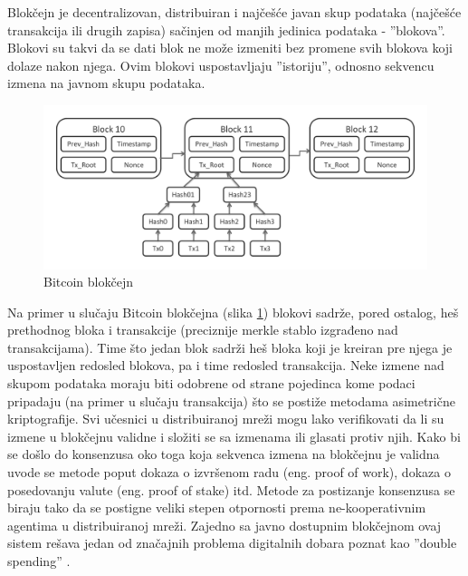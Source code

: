 \documentclass[a4paper]{article}
\begin{document}
Blokčejn je decentralizovan, distribuiran i najčešće javan skup podataka (najčešće transakcija ili drugih zapisa) \cite{wood2014ethereum} sačinjen od manjih jedinica podataka - ''blokova''.
Blokovi su takvi da se dati blok ne može izmeniti bez promene svih blokova koji dolaze nakon njega. Ovim blokovi uspostavljaju ''istoriju'', odnosno sekvencu izmena na javnom skupu podataka.
\begin{figure}[H]
    \centering
        \includegraphics[scale=0.3]{bitcoin_blockchain_diagram.pdf}
    \caption{Bitcoin blokčejn}
    \label{fig:btc_blockchain}
\end{figure}
Na primer u slučaju Bitcoin blokčejna (slika \ref{fig:btc_blockchain}) blokovi sadrže, pored ostalog, heš prethodnog bloka i transakcije (preciznije merkle stablo izgrađeno nad transakcijama).
Time što jedan blok sadrži heš bloka koji je kreiran pre njega je uspostavljen redosled blokova, pa i time redosled transakcija.
Neke izmene nad skupom podataka moraju biti odobrene od strane pojedinca kome podaci pripadaju (na primer u slučaju transakcija) što se postiže metodama asimetrične kriptografije.
Svi učesnici u distribuiranoj mreži mogu lako verifikovati da li su izmene u blokčejnu validne i složiti se sa izmenama ili glasati protiv njih.
Kako bi se došlo do konsenzusa oko toga koja sekvenca izmena na blokčejnu je validna uvode se metode poput dokaza o izvršenom radu (eng. proof of work), dokaza o posedovanju valute (eng. proof of stake) itd.
Metode za postizanje konsenzusa se biraju tako da se postigne veliki stepen otpornosti prema ne-kooperativnim agentima u distribuiranoj mreži.
Zajedno sa javno dostupnim blokčejnom ovaj sistem rešava jedan od značajnih problema digitalnih dobara poznat kao ''double spending'' \cite{nakamoto2008bitcoin}. 
\end{document}
